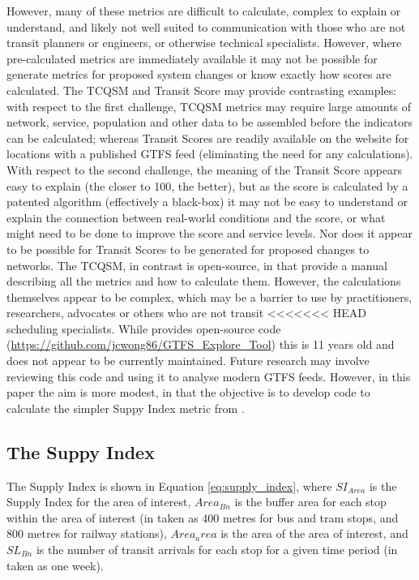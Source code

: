 \documentclass[numbered]{trbunofficial}
\begin{document}
However, many of these metrics are difficult to calculate, complex to
explain or understand, and likely not well suited to communication with
those who are not transit planners or engineers, or otherwise technical
specialists. However, where pre-calculated metrics are immediately
available it may not be possible for generate metrics for proposed
system changes or know exactly how scores are calculated. The TCQSM and
Transit Score may provide contrasting examples: with respect to the
first challenge, TCQSM metrics may require large amounts of network,
service, population and other data to be assembled before the indicators
can be calculated; whereas Transit Scores are readily available on the
\citet{WalkScore:2023tg} website for locations with a published GTFS
feed (eliminating the need for any calculations). With respect to the
second challenge, the meaning of the Transit Score appears easy to
explain (the closer to 100, the better), but as the score is calculated
by a patented algorithm (effectively a black-box) it may not be easy to
understand or explain the connection between real-world conditions and
the score, or what might need to be done to improve the score and
service levels. Nor does it appear to be possible for Transit Scores to
be generated for proposed changes to networks. The TCQSM, in contrast is
open-source, in that \citet{TCQSM:2013} provide a manual describing all
the metrics and how to calculate them. However, the calculations
themselves appear to be complex, which may be a barrier to use by
practitioners, researchers, advocates or others who are not transit
<<<<<<< HEAD
scheduling specialists. While \citet{Wong:2013aa} provides open-source
code (\url{https://github.com/jcwong86/GTFS_Explore_Tool}) this is 11
years old and does not appear to be currently maintained. Future
research may involve reviewing this code and using it to analyse modern
GTFS feeds. However, in this paper the aim is more modest, in that the
objective is to develop code to calculate the simpler Suppy Index metric
from \citet{currie2007identifying}.

\hypertarget{the-suppy-index}{%
\subsection{The Suppy Index}\label{the-suppy-index}}

The Supply Index is shown in Equation \ref{eq:supply_index}, where
\(SI_{Area}\) is the Supply Index for the area of interest,
\(Area_{Bn}\) is the buffer area for each stop within the area of
interest (in \citet{currie2007identifying} taken as 400 metres for bus
and tram stops, and 800 metres for railway stations), \(Area_area\) is
the area of the area of interest, and \(SL_{Bn}\) is the number of
transit arrivals for each stop for a given time period (in
\citet{currie2007identifying} taken as one week).
\end{document}
